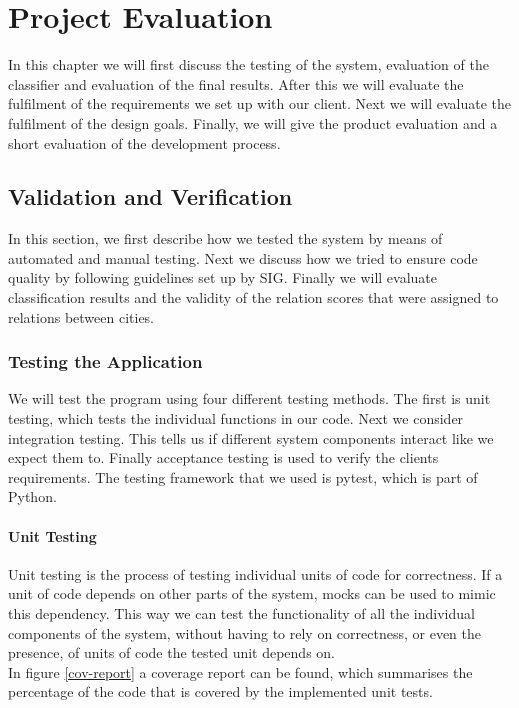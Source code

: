 \chapter{Project Evaluation}\label{sec:project-evaluation}
In this chapter we will first discuss the testing of the system, evaluation of the classifier and evaluation of the final results. After this we will evaluate the fulfilment of the requirements we set up with our client. Next we will evaluate the fulfilment of the design goals. Finally, we will give the product evaluation and a short evaluation of the development process.

\section{Validation and Verification}
In this section, we first describe how we tested the system by means of automated and manual testing. Next we discuss how we tried to ensure code quality by following guidelines set up by SIG\cite{sig}. Finally we will evaluate classification results and the validity of the relation scores that were assigned to relations between cities.

\subsection{Testing the Application}
We will test the program using four different testing methods. The first is unit testing, which tests the individual functions in our code. Next we consider integration testing. This tells us if different system components interact like we expect them to. Finally acceptance testing is used to verify the clients requirements. The testing framework that we used is pytest\cite{pytest}, which is part of Python.

\subsubsection{Unit Testing}
Unit testing is the process of testing individual units of code for correctness. If a unit of code depends on other parts of the system, mocks can be used to mimic this dependency. This way we can test the functionality of all the individual components of the system, without having to rely on correctness, or even the presence, of units of code the tested unit depends on.\\
In figure \ref{cov-report} a coverage report can be found, which summarises the percentage of the code that is covered by the implemented unit tests.

